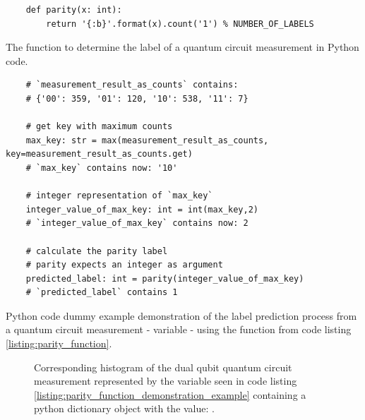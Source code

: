 \begin{listing}[!ht]
    \begin{verbatim}
    def parity(x: int):
        return '{:b}'.format(x).count('1') % NUMBER_OF_LABELS
    \end{verbatim}
    \caption{The  function to determine the label of a quantum circuit measurement in Python code.}
    \label{listing:parity_function}
\end{listing}


\begin{listing}[!ht]
    \begin{verbatim}
    # `measurement_result_as_counts` contains: 
    # {'00': 359, '01': 120, '10': 538, '11': 7}
    
    # get key with maximum counts
    max_key: str = max(measurement_result_as_counts, key=measurement_result_as_counts.get)
    # `max_key` contains now: '10'
    
    # integer representation of `max_key`
    integer_value_of_max_key: int = int(max_key,2)
    # `integer_value_of_max_key` contains now: 2
    
    # calculate the parity label
    # parity expects an integer as argument
    predicted_label: int = parity(integer_value_of_max_key)
    # `predicted_label` contains 1
    \end{verbatim}
    \caption{Python code dummy example demonstration of the label prediction process from a quantum circuit measurement - variable  - using the  function from code listing \ref{listing:parity_function}.}
    \label{listing:parity_function_demonstration_example}
\end{listing}

\begin{figure}[!h]
    \centering
    \caption{Corresponding histogram of the dual qubit quantum circuit measurement represented by the variable seen in code listing \ref{listing:parity_function_demonstration_example} containing a python dictionary object with the value: .}
    \label{figure:parity_function_example_histogram}
\end{figure}

